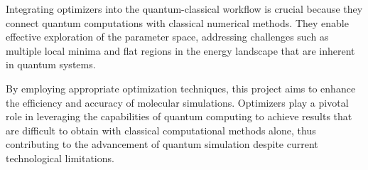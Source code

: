 Integrating optimizers into the quantum-classical workflow is crucial because they connect quantum computations with classical numerical methods. They enable effective exploration of the parameter space, addressing challenges such as multiple local minima and flat regions in the energy landscape that are inherent in quantum systems.

By employing appropriate optimization techniques, this project aims to enhance the efficiency and accuracy of molecular simulations. Optimizers play a pivotal role in leveraging the capabilities of quantum computing to achieve results that are difficult to obtain with classical computational methods alone, thus contributing to the advancement of quantum simulation despite current technological limitations.